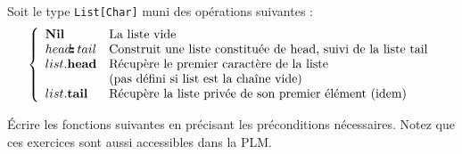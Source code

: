 \documentclass[10pt]{article}\usepackage[correction,nu]{esial}
\begin{document}
\Exercice Soit le type \texttt{List[Char]} muni des opérations suivantes :
$$\left\{
\begin{array}{ll}
  \mathbf{Nil}&\text{La liste vide}\\
  head\text{\textbf{$\!$:$\!$:}}\, tail& \text{Construit une liste constituée de head, suivi de la liste tail}\\
  list\mathbf{.head}& \text{Récupère le premier caractère de la liste}\\
  &\text{(pas défini si list est la chaîne vide)}\\
  list\mathbf{.tail}& \text{Récupère la liste privée de son premier élément (idem)}
\end{array}\right.
$$

\noindent Écrire les fonctions suivantes en précisant les préconditions
nécessaires. Notez que ces exercices sont aussi accessibles dans la PLM.
\end{document}
